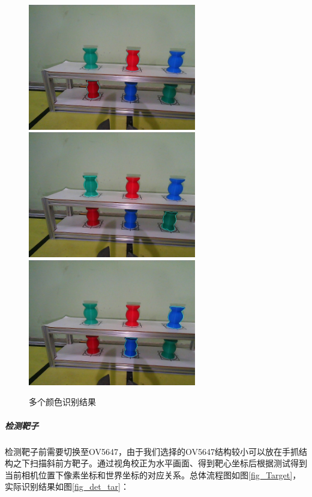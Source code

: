 \documentclass[a4paper,11pt,UTF8]{ctexart}
\begin{document}
\begin{figure}[htbp]
  \begin{center}
      \centering
      \includegraphics[height=5.5cm]{Cs_R.jpg}
      \includegraphics[height=5.5cm]{Cs_G.jpg}
      \includegraphics[height=5.5cm]{Cs_B.jpg}
      \caption{多个颜色识别结果}\label{fig_Cs_RGB}
  \end{center}
\end{figure}


\subparagraph{检测靶子}
检测靶子前需要切换至OV5647，由于我们选择的OV5647结构较小可以放在手抓结构之下扫描斜前方靶子。通过视角校正为水平画面、得到靶心坐标后根据测试得到当前相机位置下像素坐标和世界坐标的对应关系。总体流程图如图\ref{fig_Target}，实际识别结果如图\ref{fig_det_tar}：
\end{document}
